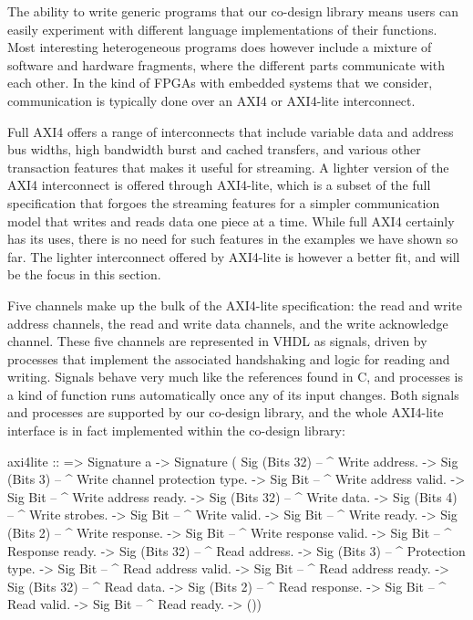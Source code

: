 \documentclass[../main.tex]{subfiles}
\begin{document}
The ability to write generic programs that our co-design library means users can easily experiment with different language implementations of their functions. Most interesting heterogeneous programs does however include a mixture of software and hardware fragments, where the different parts communicate with each other. In the kind of FPGAs with embedded systems that we consider, communication is typically done over an AXI4 or AXI4-lite interconnect. 

Full AXI4 offers a range of interconnects that include variable data and address bus widths, high bandwidth burst and cached transfers, and various other transaction features that makes it useful for streaming. A lighter version of the AXI4 interconnect is offered through AXI4-lite, which is a subset of the full specification that forgoes the streaming features for a simpler communication model that writes and reads data one piece at a time. While full AXI4 certainly has its uses, there is no need for such features in the examples we have shown so far. The lighter interconnect offered by AXI4-lite is however a better fit, and will be the focus in this section.


Five channels make up the bulk of the AXI4-lite specification: the read and write address channels, the read and write data channels, and the write acknowledge channel. These five channels are represented in VHDL as signals, driven by processes that implement the associated handshaking and logic for reading and writing. Signals behave very much like the references found in C, and processes is a kind of function runs automatically once any of its input changes. Both signals and processes are supported by our co-design library, and the whole AXI4-lite interface is in fact implemented within the co-design library:


\begin{code}
axi4lite ::
  => Signature a
  -> Signature (
          Sig (Bits 32) -- ^ Write address.
       -> Sig (Bits 3)  -- ^ Write channel protection type.
       -> Sig Bit       -- ^ Write address valid.
       -> Sig Bit       -- ^ Write address ready.
       -> Sig (Bits 32) -- ^ Write data.
       -> Sig (Bits 4)  -- ^ Write strobes.
       -> Sig Bit       -- ^ Write valid.
       -> Sig Bit       -- ^ Write ready.
       -> Sig (Bits 2)  -- ^ Write response.
       -> Sig Bit       -- ^ Write response valid.
       -> Sig Bit       -- ^ Response ready.
       -> Sig (Bits 32) -- ^ Read address.
       -> Sig (Bits 3)  -- ^ Protection type.
       -> Sig Bit       -- ^ Read address valid.
       -> Sig Bit       -- ^ Read address ready.
       -> Sig (Bits 32) -- ^ Read data.
       -> Sig (Bits 2)  -- ^ Read response.
       -> Sig Bit       -- ^ Read valid.
       -> Sig Bit       -- ^ Read ready.    
       -> ())
\end{code}
\end{document}
